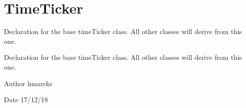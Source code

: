 \hypertarget{group__timeTicker}{}\section{Time\+Ticker}
\label{group__timeTicker}


Declaration for the base time\+Ticker class. All other classes will derive from this one.  


Declaration for the base time\+Ticker class. All other classes will derive from this one. 

\begin{DoxyAuthor}{Author}
hmarcks
\end{DoxyAuthor}
\begin{DoxyDate}{Date}
17/12/18 
\end{DoxyDate}
